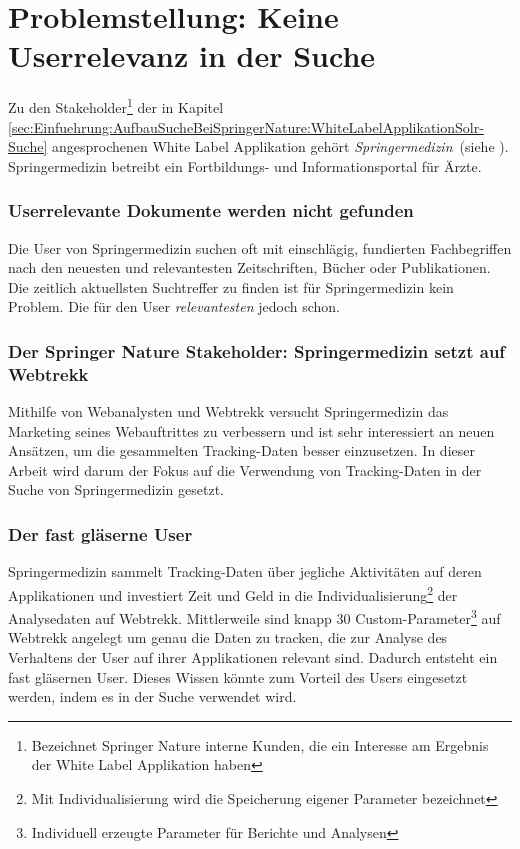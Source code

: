
\section{Problemstellung: Keine Userrelevanz in der Suche}
\label{sec:Einfuehrung:Problemstellung}

Zu den Stakeholder\footnote{Bezeichnet Springer Nature interne Kunden, die ein Interesse am Ergebnis der White Label Applikation haben} der in Kapitel \ref{sec:Einfuehrung:AufbauSucheBeiSpringerNature:WhiteLabelApplikationSolr-Suche} angesprochenen White Label Applikation gehört \textit{Springermedizin}~(siehe \cite{SMED}). Springermedizin betreibt ein Fortbildungs- und Informationsportal für Ärzte.

\subsubsection{Userrelevante Dokumente werden nicht gefunden}
\label{sec:Einfuehrung:Problemstellung:Userrelevanz}

Die User von Springermedizin suchen oft mit einschlägig, fundierten Fachbegriffen nach den neuesten und relevantesten Zeitschriften, Bücher oder Publikationen. Die zeitlich aktuellsten Suchtreffer zu finden ist für Springermedizin kein Problem. Die für den User \textit{relevantesten} jedoch schon.

\subsubsection{Der Springer Nature Stakeholder: Springermedizin setzt auf Webtrekk}
\label{sec:Einfuehrung:Problemstellung:Springermedizin}

Mithilfe von Webanalysten und Webtrekk versucht Springermedizin das Marketing seines Webauftrittes zu verbessern und ist sehr interessiert an neuen Ansätzen, um die gesammelten Tracking-Daten besser einzusetzen. In dieser Arbeit wird darum der Fokus auf die Verwendung von Tracking-Daten in der Suche von Springermedizin gesetzt. 
 
\subsubsection{Der fast gläserne User}
\label{sec:Einfuehrung:Problemstellung:Glaeserne-User}

Springermedizin sammelt Tracking-Daten über jegliche Aktivitäten auf deren Applikationen und investiert Zeit und Geld in die Individualisierung\footnote{Mit Individualisierung wird die Speicherung eigener Parameter bezeichnet} der Analysedaten auf Webtrekk. Mittlerweile sind knapp 30 Custom-Parameter\footnote{Individuell erzeugte Parameter für Berichte und Analysen} auf Webtrekk angelegt um genau die Daten zu tracken, die zur Analyse des Verhaltens der User auf ihrer Applikationen relevant sind. Dadurch entsteht ein fast \glqq gläsernen User\grqq{}. Dieses Wissen könnte zum Vorteil des Users eingesetzt werden, indem es in der Suche verwendet wird.

